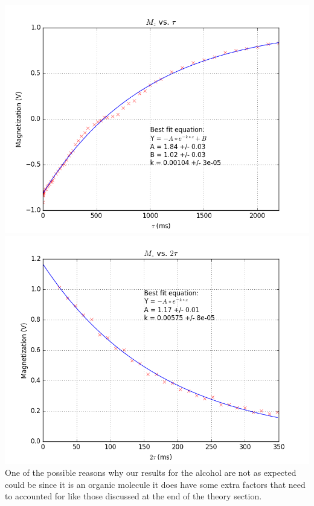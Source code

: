 \documentclass{article}
\begin{document}
{\begin{multicols}{2}
\center
\includegraphics[width=\linewidth]{pic-for-report/isoproponyl-2-T1.png}
\label{fig:36}
\includegraphics[width=\linewidth]{pic-for-report/isoproponyl-2-T2-MG.png}
\label{fig:37}
\justify
One of the possible reasons why our results for the alcohol are not as expected could be since it is an organic molecule it does have some extra factors that need to accounted for like those discussed at the end of the theory section.

\end{multicols}}
\end{document}
